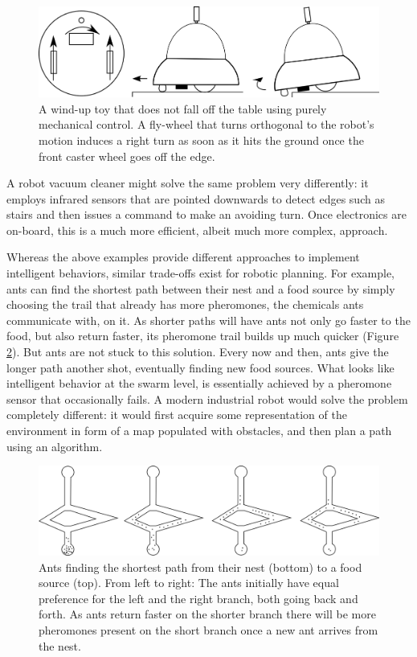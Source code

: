 \begin{figure}
	\centering
		\includegraphics[width=\textwidth]{figs/winduptoysketch.png}
	\caption{A wind-up toy that does not fall off the table using purely mechanical control. A fly-wheel that turns orthogonal to the robot's motion induces a right turn as soon as it hits the ground once the front caster wheel goes off the edge.}
	\label{fig:winduptoy}
\end{figure}

A robot vacuum cleaner might solve the same problem very differently: it employs infrared sensors that are pointed downwards to detect edges such as stairs and then issues a command to make an avoiding turn. Once electronics are on-board, this is a much more efficient, albeit much more complex, approach.

Whereas the above examples provide different approaches to implement intelligent behaviors, similar trade-offs exist for robotic planning. For example, ants can find the shortest path between their nest and a food source by simply choosing the trail that already has more pheromones, the chemicals ants communicate with, on it. As shorter paths will have ants not only go faster to the food, but also return faster, its pheromone trail builds up much quicker (Figure \ref{fig:ants}). But ants are not stuck to this solution. Every now and then, ants give the longer path another shot, eventually finding new food sources. What looks like intelligent behavior at the swarm level, is essentially achieved by a pheromone sensor that occasionally fails. A modern industrial robot would solve the problem completely different: it would first acquire some representation of the environment in form of a map populated with obstacles, and then plan a path using an algorithm.

\begin{figure}
	\centering
		\includegraphics[width=\textwidth]{figs/ants.png}
	\caption{Ants finding the shortest path from their nest (bottom) to a food source (top). From left to right: The ants initially have equal preference for the left and the right branch, both going back and forth. As ants return faster on the shorter branch there will be more pheromones present on the short branch once a new ant arrives from the nest.}
	\label{fig:ants}
\end{figure}

